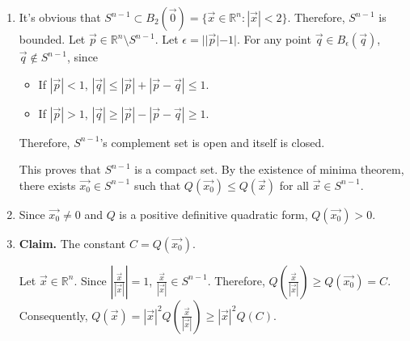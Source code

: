 \documentclass{homework}
\begin{document}
\begin{problem}{7}
\begin{enumerate}
\item It's obvious that $S^{n-1} \subset B_2(\vec{0}) = \{\vec{x} \in 
\mathbb{R}^n : |\vec{x}| < 2\}$. Therefore, $S^{n-1}$ is bounded.
Let $\vec{p} \in \mathbb{R}^n \setminus S^{n-1}$. Let $\epsilon =
||\vec{p}| - 1|$. For any point $\vec{q} \in B_{\epsilon}(\vec{q})$,
$\vec{q} \notin S^{n-1}$, since
\begin{itemize}
    \item If $|\vec{p}| < 1$, $|\vec{q}| \leq |\vec{p}| + |\vec{p} - \vec{q}|
    \le 1$.
    \item If $|\vec{p}| > 1$, $|\vec{q}| \geq |\vec{p}| - |\vec{p} - \vec{q}|
    \ge 1$.
\end{itemize}
Therefore, $S^{n-1}$'s complement set is open and itself is closed.

This proves that $S^{n-1}$ is a compact set. By the existence of minima theorem,
there exists $\vec{x_0} \in S^{n-1}$ such that $Q(\vec{x_0}) \leq Q(\vec{x})$
for all $\vec{x} \in S^{n-1}$.

\item Since $\vec{x_0} \neq 0$ and $Q$ is a positive definitive quadratic form,
$Q(\vec{x_0}) > 0$.

\item \textbf{Claim.} The constant $C = Q(\vec{x_0})$.

Let $\vec{x} \in \mathbb{R}^n$. Since $|\frac{\vec{x}}{|\vec{x}|}| = 1$,
$\frac{\vec{x}}{|\vec{x}|} \in S^{n-1}$. Therefore,
$Q(\frac{\vec{x}}{|\vec{x}|}) \geq Q(\vec{x_0}) = C$. Consequently,
$Q(\vec{x}) = |\vec{x}|^2Q(\frac{\vec{x}}{|\vec{x}|}) \geq |\vec{x}|^2Q(C)$.
\QED
\end{enumerate}
\end{problem}
\end{document}
